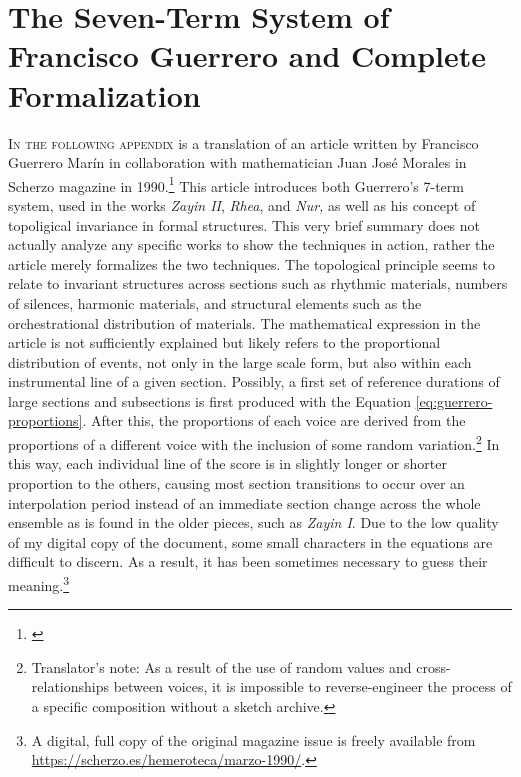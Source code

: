 
\chapter{The Seven-Term System of Francisco Guerrero and Complete Formalization}
\label{AppendixA}

\lettrine[lines=2,slope=-2pt,nindent=2pt]{\textcolor{SchoolColor}{I}}{n the following appendix} is a translation of an article written by Francisco Guerrero Marín in collaboration with mathematician Juan José Morales in Scherzo magazine in 1990.\footnote{\citet{guerrerotopology}} This article introduces both Guerrero's 7-term system, used in the works \textit{Zayin II}, \textit{Rhea}, and \textit{Nur,} as well as his concept of topoligical invariance in formal structures. This very brief summary does not actually analyze any specific works to show the techniques in action, rather the article merely formalizes the two techniques. The topological principle seems to relate to invariant structures across sections such as rhythmic materials, numbers of silences, harmonic materials, and structural elements such as the orchestrational distribution of materials. The mathematical expression in the article is not sufficiently explained but likely refers to the proportional distribution of events, not only in the large scale form, but also within each instrumental line of a given section. Possibly, a first set of reference durations of large sections and subsections is first produced with the Equation \vref{eq:guerrero-proportions}. After this, the proportions of each voice are derived from the proportions of a different voice with the inclusion of some random variation.\footnote{Translator's note: As a result of the use of random values and cross-relationships between voices, it is impossible to reverse-engineer the process of a specific composition without a sketch archive.} In this way, each individual line of the score is in slightly longer or shorter proportion to the others, causing most section transitions to occur over an interpolation period instead of an immediate section change across the whole ensemble as is found in the older pieces, such as \textit{Zayin I}. Due to the low quality of my digital copy of the document, some small characters in the equations are difficult to discern. As a result, it has been sometimes necessary to guess their meaning.\footnote{A digital, full copy of the original magazine issue is freely available from \url{https://scherzo.es/hemeroteca/marzo-1990/}.}

